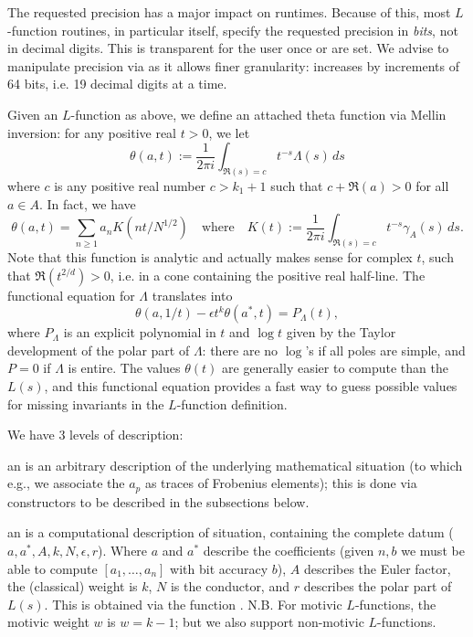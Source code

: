  The requested precision has a major impact on runtimes.
Because of this, most $L$-function routines, in particular  itself,
specify the requested precision in \emph{bits}, not in decimal digits.
This is transparent for the user once  or
 are set. We advise to manipulate precision via
 as it allows finer granularity: 
increases by increments of 64 bits, i.e. 19 decimal digits at a time.


Given an $L$-function as above, we define an attached theta function
via Mellin inversion: for any positive real $t > 0$, we let
$$ \theta(a,t) := \dfrac{1}{2\pi i}\int_{\Re(s) = c} t^{-s} \Lambda(s)\, ds $$
where $c$ is any positive real number $c > k_1+1$ such that $c + \Re(a) > 0$
for all $a\in A$. In fact, we have
$$\theta(a,t) = \sum_{n\geq 1} a_n K(nt/N^{1/2})
\quad\text{where}\quad
K(t) := \dfrac{1}{2\pi i}\int_{\Re(s) = c} t^{-s} \gamma_A(s)\, ds.$$
Note that this function is analytic and actually makes sense for complex $t$,
such that $\Re(t^{2/d}) > 0$, i.e. in a cone containing the positive real
half-line. The functional equation for $\Lambda$ translates into
$$ \theta(a,1/t) - \epsilon t^k\theta(a^*,t) = P_\Lambda(t), $$
where $P_\Lambda$ is an explicit polynomial in $t$ and $\log t$ given by the
Taylor development of the polar part of $\Lambda$: there are no $\log$'s if
all poles are simple, and $P = 0$ if $\Lambda$ is entire. The values
$\theta(t)$ are generally easier to compute than the $L(s)$, and this
functional equation provides a fast way to guess possible values for
missing invariants in the $L$-function definition.


We have 3 levels of description:

\item an  is an arbitrary description of the underlying
mathematical situation (to which e.g., we associate the $a_p$ as traces of
Frobenius elements); this is done via constructors to be described in the
subsections below.

\item an  is a computational description of situation, containing
the complete datum ($a,a^*,A,k,N,\epsilon,r$). Where $a$ and $a^*$ describe
the coefficients (given $n,b$ we must be able to compute $[a_1,\dots,a_n]$
with bit accuracy $b$), $A$ describes the Euler factor, the (classical) weight
is $k$, $N$ is the conductor, and $r$ describes the polar part of $L(s)$.
This is obtained via the function . N.B. For motivic
$L$-functions, the motivic weight $w$ is $w = k-1$; but we also support
non-motivic $L$-functions.

